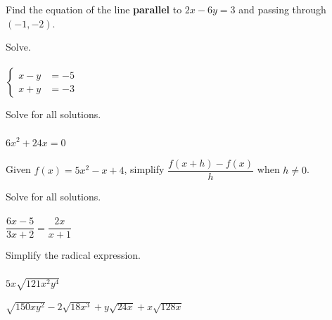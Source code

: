 \documentclass[addpoints,18pt,answers]{exam}
\begin{document}
\begin{questions}
\question[4] Find the equation of the line \textbf{parallel} to $2x-6y=3$ and passing through $(-1,-2)$.
\answerline

\newpage

\question[5] Solve.\\ \\ $\left\{\begin{aligned}x-y &= -5\\ x+y &= -3\end{aligned}\right.$
\answerline

\newpage

\question[4] Solve for all solutions.\\ \\ $6x^2+24x=0$
\answerline

\newpage

\question[5] Given $f(x)=5x^2-x+4$, simplify $\dfrac{f(x+h)-f(x)}{h}$ when $h\neq 0$.
\answerline

\newpage

\question[5] Solve for all solutions. \\ \\ $\dfrac{6x-5}{3x+2} = \dfrac{2x}{x+1}$
\answerline

\newpage

\question[4] Simplify the radical expression.\\ \\ $5x\sqrt{121x^2y^4}$
\answerline

\newpage


\question[5]\label{rad-simp-begin} $\sqrt{150xy^2}-2\sqrt{18x^3}+y\sqrt{24x}+x\sqrt{128x}$
\answerline

\newpage
{}


\end{questions}
\end{document}
